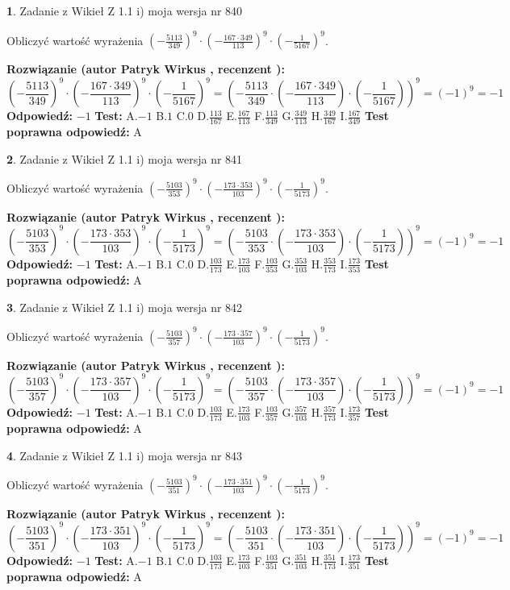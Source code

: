 \documentclass[12pt, a4paper]{article}
\theoremstyle{definition} %
\newtheorem{zad}{}
\newcommand{\zadStart}[1]{\begin{zad}#1\newline}
\newcommand{\zadStop}{\end{zad}}
\newcommand{\rozwStart}[2]{\noindent \textbf{Rozwiązanie (autor #1 , recenzent #2): }\newline}
\newcommand{\rozwStop}{\newline}
\newcommand{\odpStart}{\noindent \textbf{Odpowiedź:}\newline}
\newcommand{\odpStop}{\newline}
\newcommand{\testStart}{\noindent \textbf{Test:}\newline}
\newcommand{\testStop}{\newline}
\newcommand{\kluczStart}{\noindent \textbf{Test poprawna odpowiedź:}\newline}
\newcommand{\kluczStop}{\newline}
\begin{document}
\zadStart{Zadanie z Wikieł Z 1.1 i) moja wersja nr 840}

Obliczyć wartość wyrażenia $(-\frac{5113}{349})^{9} \cdot (-\frac{167 \cdot 349}{113})^{9} \cdot (-\frac{1}{5167})^{9}$.
\zadStop
\rozwStart{Patryk Wirkus}{}
$$(-\frac{5113}{349})^{9} \cdot (-\frac{167 \cdot 349}{113})^{9} \cdot (-\frac{1}{5167})^{9} = (-\frac{5113}{349} \cdot (-\frac{167 \cdot 349}{113}) \cdot (-\frac{1}{5167}))^{9} = (-1)^{9} = -1$$
\rozwStop
\odpStart
$-1$
\odpStop
\testStart
A.$-1$ B.$1$ C.$0$ D.$\frac{113}{167}$ E.$\frac{167}{113}$
F.$\frac{113}{349}$ G.$\frac{349}{113}$
H.$\frac{349}{167}$
I.$\frac{167}{349}$
\testStop
\kluczStart
A
\kluczStop



\zadStart{Zadanie z Wikieł Z 1.1 i) moja wersja nr 841}

Obliczyć wartość wyrażenia $(-\frac{5103}{353})^{9} \cdot (-\frac{173 \cdot 353}{103})^{9} \cdot (-\frac{1}{5173})^{9}$.
\zadStop
\rozwStart{Patryk Wirkus}{}
$$(-\frac{5103}{353})^{9} \cdot (-\frac{173 \cdot 353}{103})^{9} \cdot (-\frac{1}{5173})^{9} = (-\frac{5103}{353} \cdot (-\frac{173 \cdot 353}{103}) \cdot (-\frac{1}{5173}))^{9} = (-1)^{9} = -1$$
\rozwStop
\odpStart
$-1$
\odpStop
\testStart
A.$-1$ B.$1$ C.$0$ D.$\frac{103}{173}$ E.$\frac{173}{103}$
F.$\frac{103}{353}$ G.$\frac{353}{103}$
H.$\frac{353}{173}$
I.$\frac{173}{353}$
\testStop
\kluczStart
A
\kluczStop



\zadStart{Zadanie z Wikieł Z 1.1 i) moja wersja nr 842}

Obliczyć wartość wyrażenia $(-\frac{5103}{357})^{9} \cdot (-\frac{173 \cdot 357}{103})^{9} \cdot (-\frac{1}{5173})^{9}$.
\zadStop
\rozwStart{Patryk Wirkus}{}
$$(-\frac{5103}{357})^{9} \cdot (-\frac{173 \cdot 357}{103})^{9} \cdot (-\frac{1}{5173})^{9} = (-\frac{5103}{357} \cdot (-\frac{173 \cdot 357}{103}) \cdot (-\frac{1}{5173}))^{9} = (-1)^{9} = -1$$
\rozwStop
\odpStart
$-1$
\odpStop
\testStart
A.$-1$ B.$1$ C.$0$ D.$\frac{103}{173}$ E.$\frac{173}{103}$
F.$\frac{103}{357}$ G.$\frac{357}{103}$
H.$\frac{357}{173}$
I.$\frac{173}{357}$
\testStop
\kluczStart
A
\kluczStop



\zadStart{Zadanie z Wikieł Z 1.1 i) moja wersja nr 843}

Obliczyć wartość wyrażenia $(-\frac{5103}{351})^{9} \cdot (-\frac{173 \cdot 351}{103})^{9} \cdot (-\frac{1}{5173})^{9}$.
\zadStop
\rozwStart{Patryk Wirkus}{}
$$(-\frac{5103}{351})^{9} \cdot (-\frac{173 \cdot 351}{103})^{9} \cdot (-\frac{1}{5173})^{9} = (-\frac{5103}{351} \cdot (-\frac{173 \cdot 351}{103}) \cdot (-\frac{1}{5173}))^{9} = (-1)^{9} = -1$$
\rozwStop
\odpStart
$-1$
\odpStop
\testStart
A.$-1$ B.$1$ C.$0$ D.$\frac{103}{173}$ E.$\frac{173}{103}$
F.$\frac{103}{351}$ G.$\frac{351}{103}$
H.$\frac{351}{173}$
I.$\frac{173}{351}$
\testStop
\kluczStart
A
\kluczStop
\end{document}
